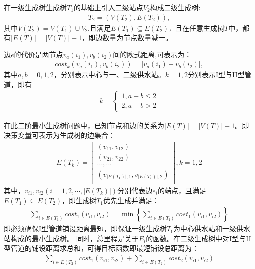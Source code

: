 \documentclass{whutmod}
\begin{document}
		在一级生成树生成树$T_1$的基础上引入二级站点$V_2$构成二级生成树:
		\begin{gather*}	
		T_{2}=(V(T_{2}),E(T_{2})),
		\end{gather*}
		其中$V(T_{2})=V(T_{1})\cup V_2$,且满足$E(T_{1})\subseteq  E(T_{2})$，且在任意生成树$T$中，都有$|E(T)|=|V(T)|-1$，即边数量为节点数量减一。
		
		边$e$的代价是两节点$v_a(i_1), v_b(i_2)$间的欧式距离,可表示为：
		\begin{gather}
		cost_{k}(v_a(i_1),v_b(i_2))=\left | v_a(i_1)-v_b(i_2) \right |,
		\end{gather}
		其中$a,b=0,1,2$，分别表示中心与一、二级供水站。$k=1,2$分别表示I型与II型管道，即有
			\begin{gather}
			k=\left\{\begin{matrix}1,a+b\leqslant 2
			\\ 2,a+b>2
			\end{matrix}\right.
			\end{gather}
		
		
		
		
			在此二阶最小生成树问题中，已知节点和边的关系为$|E(T)|=|V(T)|-1 $。即决策变量可表示为生成树的边集合：
			\begin{gather}
			E(T_k)=
			\begin{bmatrix}
			(v_{11} ,v_{12}) \\ 
			(v_{21} ,v_{22} )\\ 
			...,...\\
			(v_{|E(T_k)|,1},v_{|E(T_k)|,2})\\
			\end{bmatrix},k=1,2
			\end{gather}
			其中，$v_{i1}, v_{i2}(i =1,2,\cdots,|E(T_k)|)$分别代表边$e_i$的端点，且满足$E(T_1)\subseteq E(T_2)$，即生成树$T_1$优先生成并满足：
			\begin{gather}
			\sum_{i\in E(T_1) }cost_1(v_{i1},v_{i2})=\min\left \{ 	\sum_{i\in E(T_1) }cost_1(v_{i1},v_{i2}) \right \}
			\end{gather}
			即必须确保I型管道铺设距离最短，即保证一级生成树$T_1$为中心供水站和一级供水站构成的最小生成树。
			 同时，总里程是关于$E_{i}$的函数。在二级生成树中对I型与II型管道的铺设距离求总和，可得目标函数即最短铺设总距离为：
			\begin{gather}
	         	\sum_{i\in E(T_2) }cost_1(v_{i1},v_{i2})+\sum_{i\in E(T_2) }cost_2(v_{i1},v_{i2})
			\end{gather}
			
\end{document}
